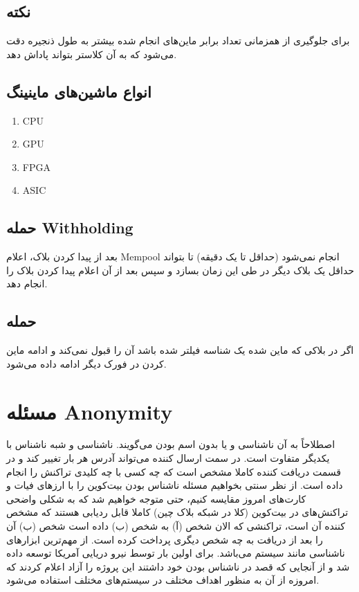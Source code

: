 \documentclass[10pt, a4paper]{article}
\begin{document}
\subsection*{نکته}

برای جلوگیری از همزمانی تعداد برابر ماین‌های انجام شده بیشتر به طول ذنجیره دقت
می‌شود که به آن کلاستر بتواند پاداش دهد.

\subsection*{انواع ماشین‌های ماینینگ}

\begin{enumerate}
    \item CPU
    \item GPU
    \item FPGA
    \item ASIC
\end{enumerate}

\subsection{حمله Withholding}

بعد از پیدا کردن بلاک، اعلام Mempool انجام نمی‌شود (حداقل تا یک دقیقه) تا بتواند
حداقل یک بلاک دیگر در طی این زمان بسازد و سپس بعد از آن اعلام پیدا کردن بلاک را
انجام دهد.

\subsection{حمله }

اگر در بلاکی که ماین شده یک شناسه فیلتر شده باشد آن را قبول نمی‌کند و ادامه ماین
کردن در فورک دیگر ادامه داده می‌شود.

\section{مسئله Anonymity}

اصطلاحاً به آن ناشناسی و یا بدون اسم بودن می‌گویند. ناشناسی و شبه ناشناس با
یکدیگر متفاوت است. در سمت ارسال کننده می‌تواند آدرس  هر بار تغییر
کند و در قسمت دریافت کننده کاملا مشخص است که چه کسی با چه کلیدی تراکنش را انجام
داده است. از نظر سنتی بخواهیم مسئله ناشناس بودن بیت‌کوین را با ارز‌های فیات و
کارت‌های امروز مقایسه کنیم، حتی متوجه خواهیم شد که به شکلی واضحی تراکنش‌های در
بیت‌کوین (کلا در شبکه بلاک چین) کاملا قابل ردیابی هستند که مشخص کننده آن است،
تراکنشی که الان شخص (آ) به شخص (ب) داده است شخص (ب) آن را بعد از دریافت به چه
شخص دیگری پرداخت کرده است. از مهم‌ترین ابزار‌های ناشناسی مانند سیستم 
می‌باشد.  برای اولین بار توسط نیرو دریایی آمریکا توسعه داده شد و از
آنجایی که قصد در ناشناس بودن خود داشتند این پروژه را آزاد اعلام کردند که امروزه
از آن به منظور اهداف مختلف در سیستم‌های مختلف استفاده می‌شود.
\end{document}
